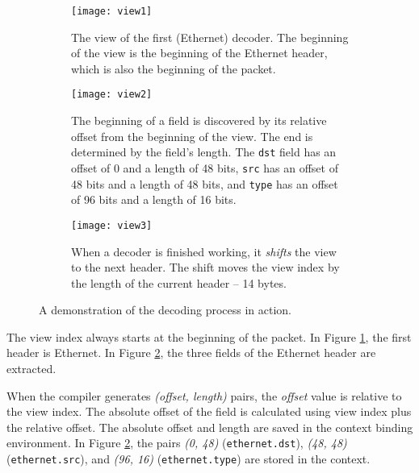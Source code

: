 \begin{figure}[ht]
\begin{subfigure}[t, scale=0.5]{.45\textwidth}
  \centering
  \texttt{[image: view1]}
  \caption{The view of the first (Ethernet) decoder. 
  The beginning of the view is the beginning of the Ethernet
  header, which is also the beginning of the packet.}
  \label{fg:view1}
\end{subfigure}%
\hfill
\begin{subfigure}[t, scale=0.5]{0.45\textwidth}
  \centering
  \texttt{[image: view2]}
  \caption{The beginning of a field is discovered by its relative offset from
the beginning of the view. The end is determined by the field's length. The \texttt{dst} field has an offset of 0 and a length of 48 bits, 	\texttt{src} has an offset of 48 bits and a length of 48 bits, and \texttt{type} has an offset of 96 bits and a length of 16 bits.}
  \label{fg:view2}
\end{subfigure}

\begin{subfigure}[t]{.45\textwidth}
  \centering
  \texttt{[image: view3]}
  \caption{When a decoder is finished working, it \textit{shifts} the view to
the next header. The shift moves the view index by the length of the current
header -- 14 bytes.}
  \label{fg:view3}
\end{subfigure}%
\caption{A demonstration of the decoding process in action.}
\label{fg:decoding}
\end{figure}

 
The view index always starts at the beginning of the packet.
In Figure \ref{fg:view1}, the first header is Ethernet.
In Figure \ref{fg:view2}, the three fields of the Ethernet header
are extracted.

When the compiler generates \textit{(offset, length)} pairs,
the \emph{offset} value is relative to the view index. The
absolute offset of the field is calculated using view index plus
the relative offset.
The absolute offset and length are saved in the context binding environment.
In Figure \ref{fg:view2}, the pairs \textit{(0, 48)} (\texttt{ethernet.dst}),
\textit{(48, 48)} (\texttt{ethernet.src}), and \textit{(96, 16)} 
(\texttt{ethernet.type}) are stored in the context.


